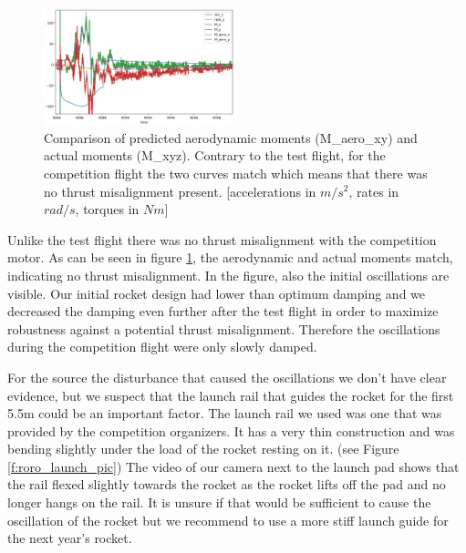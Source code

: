 \begin{figure}[h!]
    \centering
        \includegraphics[width=0.5\textwidth]{img/competition_flight_graph.png}
        \caption{Comparison of predicted aerodynamic moments (M_aero_xy) and actual moments (M_xyz). Contrary to the test flight, for the competition flight the two curves match which means that there was no thrust misalignment present. [accelerations in $m/s^2$, rates in $rad/s$, torques in $Nm$]}
        \label{f:comp_graph}
 \end{figure}

Unlike the test flight there was no thrust misalignment with the competition motor. As can be seen in figure \ref{f:comp_graph}, the aerodynamic and actual moments match, indicating no thrust misalignment.
In the figure, also the initial oscillations are visible.
Our initial rocket design had lower than optimum damping and we decreased the damping even further after the test flight in order to maximize robustness against a potential thrust misalignment.
Therefore the oscillations during the competition flight were only slowly damped.

For the source the disturbance that caused the oscillations we don't have clear evidence, but we suspect that the launch rail that guides the rocket for the first 5.5m could be an important factor.
The launch rail we used was one that was provided by the competition organizers.
It has a very thin construction and was bending slightly under the load of the rocket resting on it. (see Figure \ref{f:roro_launch_pic})
The video of our camera next to the launch pad shows that the rail flexed slightly towards the rocket as the rocket lifts off the pad and no longer hangs on the rail.
It is unsure if that would be sufficient to cause the oscillation of the rocket but we recommend to use a more stiff launch guide for the next year's rocket.

